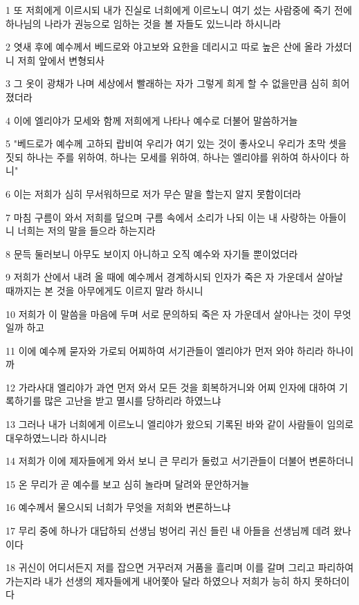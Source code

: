 \par 1 또 저희에게 이르시되 내가 진실로 너희에게 이르노니 여기 섰는 사람중에 죽기 전에 하나님의 나라가 권능으로 임하는 것을 볼 자들도 있느니라 하시니라
\par 2 엿새 후에 예수께서 베드로와 야고보와 요한을 데리시고 따로 높은 산에 올라 가셨더니 저희 앞에서 변형되사
\par 3 그 옷이 광채가 나며 세상에서 빨래하는 자가 그렇게 희게 할 수 없을만큼 심히 희어졌더라
\par 4 이에 엘리야가 모세와 함께 저희에게 나타나 예수로 더불어 말씀하거늘
\par 5 "베드로가 예수께 고하되 랍비여 우리가 여기 있는 것이 좋사오니 우리가 초막 셋을 짓되 하나는 주를 위하여, 하나는 모세를 위하여, 하나는 엘리야를 위하여 하사이다 하니"
\par 6 이는 저희가 심히 무서워하므로 저가 무슨 말을 할는지 알지 못함이더라
\par 7 마침 구름이 와서 저희를 덮으며 구름 속에서 소리가 나되 이는 내 사랑하는 아들이니 너희는 저의 말을 들으라 하는지라
\par 8 문득 둘러보니 아무도 보이지 아니하고 오직 예수와 자기들 뿐이었더라
\par 9 저희가 산에서 내려 올 때에 예수께서 경계하시되 인자가 죽은 자 가운데서 살아날 때까지는 본 것을 아무에게도 이르지 말라 하시니
\par 10 저희가 이 말씀을 마음에 두며 서로 문의하되 죽은 자 가운데서 살아나는 것이 무엇일까 하고
\par 11 이에 예수께 묻자와 가로되 어찌하여 서기관들이 엘리야가 먼저 와야 하리라 하나이까
\par 12 가라사대 엘리야가 과연 먼저 와서 모든 것을 회복하거니와 어찌 인자에 대하여 기록하기를 많은 고난을 받고 멸시를 당하리라 하였느냐
\par 13 그러나 내가 너희에게 이르노니 엘리야가 왔으되 기록된 바와 같이 사람들이 임의로 대우하였느니라 하시니라
\par 14 저희가 이에 제자들에게 와서 보니 큰 무리가 둘렀고 서기관들이 더불어 변론하더니
\par 15 온 무리가 곧 예수를 보고 심히 놀라며 달려와 문안하거늘
\par 16 예수께서 물으시되 너희가 무엇을 저희와 변론하느냐
\par 17 무리 중에 하나가 대답하되 선생님 벙어리 귀신 들린 내 아들을 선생님께 데려 왔나이다
\par 18 귀신이 어디서든지 저를 잡으면 거꾸러져 거품을 흘리며 이를 갈며 그리고 파리하여 가는지라 내가 선생의 제자들에게 내어쫓아 달라 하였으나 저희가 능히 하지 못하더이다
